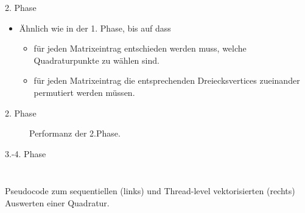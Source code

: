 \documentclass[10pt]{beamer}
\begin{document}
\begin{frame}{2. Phase}
  \begin{itemize}
    \item Ähnlich wie in der 1. Phase, bis auf dass
    \begin{itemize}
      \item für jeden Matrixeintrag entschieden werden muss, welche
            Quadraturpunkte zu wählen sind.
      \item für jeden Matrixeintrag die entsprechenden Dreiecksvertices
            zueinander permutiert werden müssen.
    \end{itemize}
  \end{itemize}
\end{frame}

\begin{frame}{2. Phase}
  \begin{figure}
    \centering
    \caption{Performanz der 2.Phase.}
  \end{figure}
\end{frame}

\begin{frame}{3.-4. Phase}
  \begin{columns}
      \begin{algorithm}[H]
        \begin{algorithmic}[1]
          \footnotesize
          {
          \EndFor{}
          }
        \end{algorithmic}
      \end{algorithm}
      \begin{algorithm}[H]
        \begin{algorithmic}[1]
          \footnotesize
          {
            \EndIf{}
          \EndFor{}
          }
        \end{algorithmic}
      \end{algorithm}
  \end{columns}
  \begin{center}
    Pseudocode zum sequentiellen (links) und Thread-level vektorisierten
    (rechts) Auswerten einer Quadratur.
  \end{center}
\end{frame}
\end{document}

